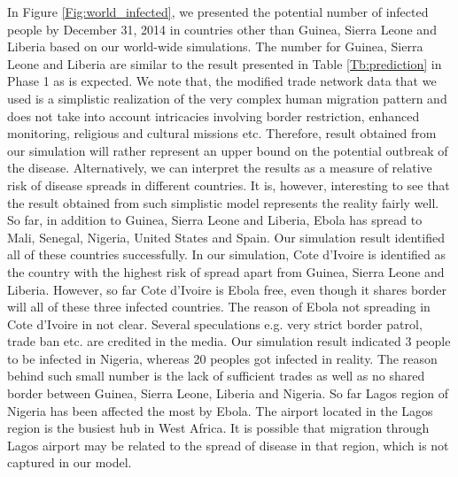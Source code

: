 \documentclass[10pt, journal,onecolumn]{IEEEtran}
\begin{document}
In Figure \ref{Fig:world_infected}, we presented the potential number of infected people by December
31, 2014 in countries other than Guinea, Sierra Leone and Liberia based on our world-wide
simulations. The number for Guinea, Sierra Leone and Liberia are similar to the result presented in
Table \ref{Tb:prediction} in Phase 1 as is expected. We note that, the modified trade network data
that we used is a simplistic realization of the very complex human migration pattern and does not
take into account intricacies involving border restriction, enhanced monitoring, religious and
cultural missions etc. Therefore, result obtained from our simulation  will rather represent  an
upper bound on the potential outbreak of the disease. Alternatively, we can interpret the results as
a measure of relative risk of disease spreads in different countries. It is, however, interesting to
see that the result obtained from such simplistic model represents the reality fairly well. So far,
in addition to  Guinea, Sierra Leone and Liberia, Ebola has spread to Mali, Senegal, Nigeria, United
States and Spain. Our simulation result identified all of these countries successfully. In our
simulation, Cote d'Ivoire is identified as the country with the highest risk of spread apart from
Guinea, Sierra Leone and Liberia. However, so far Cote d'Ivoire is Ebola free, even though it shares
border will all of these three infected countries. The reason of Ebola not spreading in Cote
d'Ivoire in not clear. Several speculations e.g. very strict border patrol, trade ban etc. are
credited in the media. Our simulation result indicated 3 people to be infected in Nigeria, whereas
20 peoples got infected in reality. The reason behind such small number is the lack of sufficient
trades as well as no shared border between Guinea, Sierra Leone, Liberia and Nigeria. So far Lagos
region of Nigeria has been affected the most by Ebola. The airport located in the Lagos region is
the busiest hub in West Africa. It is possible that migration through Lagos airport may be related
to the spread of disease in that region, which is not captured in our model.
\end{document}
